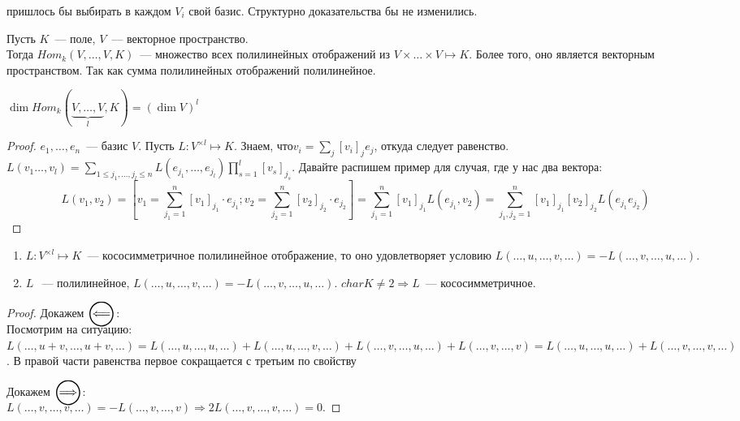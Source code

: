 пришлось бы выбирать в каждом $V_i$ свой базис. Структурно доказательства бы не изменились.
\begin{definition}
    Пусть $K$~--- поле, $V$~--- векторное пространство.\\ 
    Тогда $Hom_k(V,\dots, V,K)$~--- множество всех полилинейных отображений
    из $V\times\dots\times V\mapsto K$.
    Более того, оно является векторным пространством. Так как сумма полилинейных
    отображений полилинейное.
\end{definition}
\begin{remark}
    $\dim Hom_k(\underbrace{V,\dots, V}_{l}, K) = (\dim V)^l$ 
\end{remark}
\begin{proof}
    $e_1,\dots, e_n$~--- базис $V$.
    Пусть $L: V^{\times l} \mapsto K$. 
    Знаем, что$v_i = \sum\limits_{j}^{}{[v_i]_je_j}$, откуда следует равенство.
    $L(v_1\dots, v_l) = \sum\limits_{1\le j_1,\dots,j_l\le n}{L(e_{j_1}, \dots, e_{j_l})
    \prod\limits_{s=1}^{l}[v_s]_{j_s}}$.
    Давайте распишем пример для случая, где у нас два вектора:
    \[
        L(v_1, v_2) = \left[v_1 = \sum\limits_{j_1=1}^{n}{[v_1]_{j_1}\cdot e_{j_1}};
        v_2 = \sum\limits_{j_2=1}^{n}{[v_2]_{j_2}\cdot e_{j_2}}\right]=
        \sum\limits_{j_1=1}^{n}{[v_1]_{j_1}L(e_{j_1}, v_2)} =
        \sum\limits_{j_1,j_2=1}^{n}{[v_1]_{j_1}[v_2]_{j_2}L(e_{j_1}e_{j_2})}
    \]
\end{proof}
\begin{statement}\leavevmode
    \begin{enumerate}
        \item
            $L: V^{\times l}\mapsto K$~--- кососимметричное полилинейное отображение, то
            оно удовлетворяет условию $L(\dots, u,\dots, v,\dots) = -L(\dots,v,\dots,u,\dots)$.
        \item 
            $L~$~--- полилинейное, $L(\dots, u,\dots,v,\dots) = -L(\dots, v,\dots, u,\dots)$.
            $char K \not= 2 \Rightarrow L$~--- кососимметричное.
    \end{enumerate}
\end{statement}
\begin{proof}\leavevmode
    Докажем $\ola$:\\
    Посмотрим на ситуацию: $L(\dots, u + v, \dots, u + v,\dots) = 
    L(\dots, u,\dots, u,\dots) + L(\dots, u, \dots, v,\dots) + 
    L(\dots, v,\dots,u,\dots)+L(\dots, v,\dots, v) = L(\dots, u,\dots, u,\dots) + 
    L(\dots, v,\dots, v,\dots)$. В правой
    части равенства первое сокращается с третьим по свойству

    Докажем $\ora $:\\
    $L(\dots, v,\dots,v,\dots) = -L(\dots,v,\dots,v) \Rightarrow 
    2L(\dots,v,\dots,v,\dots) = 0$.
\end{proof}

